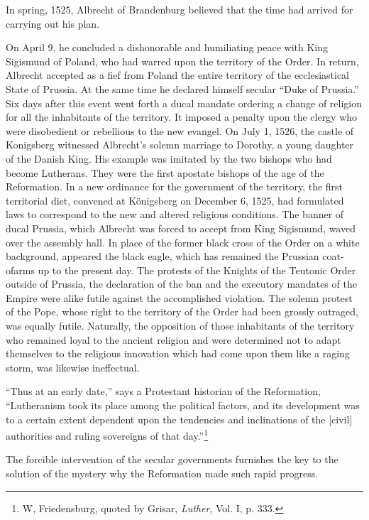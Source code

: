 In spring, 1525, Albrecht of Brandenburg believed that the time
had arrived for carrying out his plan.

On April 9, he concluded a dishonorable and humiliating peace
with King Sigismund of Poland, who had warred upon the territory
of the Order. In return, Albrecht accepted as a fief from Poland the
entire territory of the ecclesiastical State of Prussia. At the same
time he declared himself secular “Duke of Prussia.” Six days after
this event went forth a ducal mandate ordering a change of religion
for all the inhabitants of the territory. It imposed a penalty upon
the clergy who were disobedient or rebellious to the new evangel.
On July 1, 1526, the castle of Konigsberg witnessed Albrecht’s solemn
marriage to Dorothy, a young daughter of the Danish King.
His example was imitated by the two bishops who had become Lutherans.
They were the first apostate bishops of the age of the Reformation.
In a new ordinance for the government of the territory, the
first territorial diet, convened at Königsberg on December 6, 1525,
had formulated laws to correspond to the new and altered religious
conditions. The banner of ducal Prussia, which Albrecht was forced
to accept from King Sigismund, waved over the assembly hall. In
place of the former black cross of the Order on a white background,
appeared the black eagle, which has remained the Prussian coat-ofarms
up to the present day. The protests of the Knights of the Teutonic
Order outside of Prussia, the declaration of the ban and the
executory mandates of the Empire were alike futile against the accomplished
violation. The solemn protest of the Pope, whose right
to the territory of the Order had been grossly outraged, was equally
futile. Naturally, the opposition of those inhabitants of the territory
who remained loyal to the ancient religion and were determined not
to adapt themselves to the religious innovation which had come upon
them like a raging storm, was likewise ineffectual.

“Thus at an early date,” says a Protestant historian of the Reformation,
“Lutheranism took its place among the political factors, and
its development was to a certain extent dependent upon the tendencies
and inclinations of the [civil] authorities and ruling sovereigns
of that day.”\footnote{W, Friedensburg, quoted by Grisar, \textit{Luther}, Vol. I, p. 333.}

The forcible intervention of the secular governments furnishes the
key to the solution of the mystery why the Reformation made such
rapid progress.

